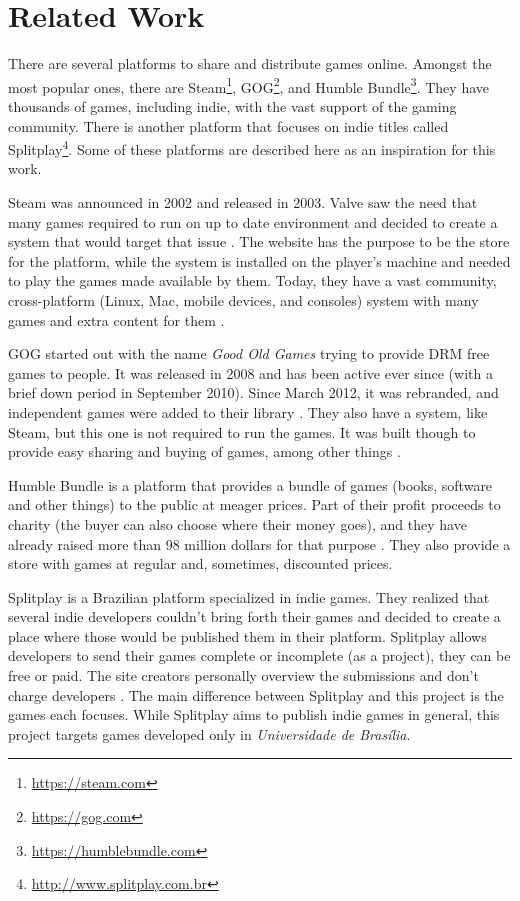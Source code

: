\section{Related Work}
\label {sec:related_work}

There are several platforms to share and distribute games online. Amongst the most popular ones, there are Steam\footnote{ \href{https://steam.com}{https://steam.com} }, GOG\footnote{ \href{https://gog.com}{https://gog.com} }, and Humble Bundle\footnote{ \href{https://humblebundle.com}{https://humblebundle.com} }. They have thousands of games, including indie, with the vast support of the gaming community. There is another platform that focuses on indie titles called Splitplay\footnote{ \href{http://www.splitplay.com.br}{http://www.splitplay.com.br} }. Some of these platforms are described here as an inspiration for this work.

Steam was announced in 2002 and released in 2003. Valve saw the need that many games required to run on up to date environment and decided to create a system that would target that issue \cite{wikipedia2017steam}. The website has the purpose to be the store for the platform, while the system is installed on the player's machine and needed to play the games made available by them. Today, they have a vast community, cross-platform (Linux, Mac, mobile devices, and consoles) system with many games and extra content for them \cite{steam2017}.

GOG started out with the name \textit{Good Old Games} trying to provide DRM free games to people. It was released in 2008 and has been active ever since (with a brief down period in September 2010). Since March 2012, it was rebranded, and independent games were added to their library \cite{wikipedia2017gog}. They also have a system, like Steam, but this one is not required to run the games. It was built though to provide easy sharing and buying of games, among other things \cite{gog2017}.

Humble Bundle is a platform that provides a bundle of games (books, software and other things) to the public at meager prices. Part of their profit proceeds to charity (the buyer can also choose where their money goes), and they have already raised more than 98 million dollars for that purpose \cite{humblebundle2017}. They also provide a store with games at regular and, sometimes, discounted prices.

Splitplay is a Brazilian platform specialized in indie games. They realized that several indie developers couldn't bring forth their games and decided to create a place where those would be published them in their platform. Splitplay allows developers to send their games complete or incomplete (as a project), they can be free or paid. The site creators personally overview the submissions and don't charge developers \cite{splitplay2017}. The main difference between Splitplay and this project is the games each focuses. While Splitplay aims to publish indie games in general, this project targets games developed only in \textit{Universidade de Brasília}.

